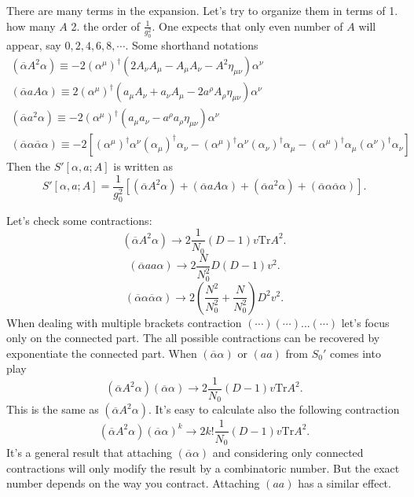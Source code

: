 There are many terms in the expansion.
Let's try to organize them in terms of
1. how many $A$
2. the order of $\frac{1}{g^2_0}$.
One expects that only even number of $A$ will appear, say $0,2,4,6,8,\cdots$.
Some shorthand notations
\begin{align*}
	(\overline{\alpha} A^2 \alpha) \equiv -2(\alpha^\mu)^\dagger (2 A_\nu A_\mu - A_\mu A_\nu -  A^2 \eta_{\mu\nu}) \alpha^\nu
	\\
	(\overline{\alpha} a A \alpha) \equiv
	 2 (\alpha^\mu)^\dagger (a_\mu A_\nu + a_\nu A_\mu - 2 a^\rho A_\rho \eta_{\mu\nu}) \alpha^\nu
	 \\
	 (\overline{\alpha} a^2 \alpha) \equiv -2 (\alpha^\mu)^\dagger
	(a_\mu a_\nu - a^\rho a_\rho \eta_{\mu\nu}) \alpha^\nu
	\\
	(\overline{\alpha}\alpha\overline{\alpha}\alpha) \equiv 
	-2 \left[	(\alpha^\mu)^\dagger \alpha^\nu (\alpha_\mu)^\dagger \alpha_\nu 
	- (\alpha^\mu)^\dagger \alpha^\nu (\alpha_\nu)^\dagger \alpha_\mu
	- (\alpha^\mu)^\dagger \alpha_\mu (\alpha^\nu)^\dagger \alpha_\nu \right]
\end{align*}
Then the $S'[\alpha,a;A]$ is written as
\[
	S'[\alpha,a;A] = \frac{1}{g_0^2} \left[ (\overline{\alpha} A^2 \alpha)
	+ (\overline{\alpha} a A \alpha) + (\overline{\alpha} a^2 \alpha) +(\overline{\alpha}\alpha\overline{\alpha}\alpha) \right] 
.\] 

Let's check some contractions:
\[
	(\overline{\alpha} A^2 \alpha) \to 2 \frac{1}{N_0} (D-1) v\mathrm{Tr}A^2
.\] 
\[
	(\overline{\alpha} a a \alpha) \to 2 \frac{N}{N_0^2} D (D-1) v^2
.\] 
\[
	(\overline{\alpha}\alpha \overline{\alpha}\alpha)
	\to 2 \left( \frac{N^2}{N_0^2} + \frac{N}{N_0^2} \right)D^2 v^2   
.\] 
When dealing with multiple brackets contraction $(\cdots)(\cdots)...(\cdots)$
let's focus only on the connected part.
The all possible contractions can be recovered by exponentiate the connected part.
When $(\overline{\alpha}\alpha)$ or $(aa)$ from $S_0'$ comes into play
\[
	(\overline{\alpha} A^2 \alpha) (\overline{\alpha} \alpha)
	\to 2 \frac{1}{N_0} (D-1) v\mathrm{Tr}A^2
.\] 
This is the same as $(\overline{\alpha}A^2\alpha)$.
It's easy to calculate also the following contraction
\[
	(\overline{\alpha}A^2\alpha)(\overline{\alpha}\alpha)^k
	\to 2 k! \frac{1}{N_0} (D-1) v \mathrm{Tr}A^2
.\] 
It's a general result that attaching $(\overline{\alpha}\alpha)$
and considering only connected contractions will only modify the result
by a combinatoric number.
But the exact number depends on the way you contract.
Attaching $(aa)$ has a similar effect.

